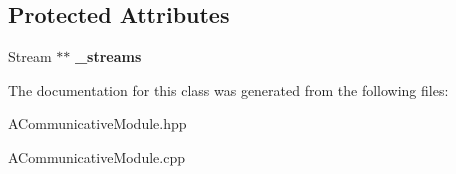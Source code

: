 \subsection*{Protected Attributes}
\begin{DoxyCompactItemize}
\item 
\mbox{\label{classwood_box_1_1module_1_1_a_communicative_module_ad3250710e1367c6a40730a96b4cccc70}} 
Stream $\ast$$\ast$ {\bfseries \+\_\+streams}
\end{DoxyCompactItemize}


The documentation for this class was generated from the following files\+:\begin{DoxyCompactItemize}
\item 
A\+Communicative\+Module.\+hpp\item 
A\+Communicative\+Module.\+cpp\end{DoxyCompactItemize}

